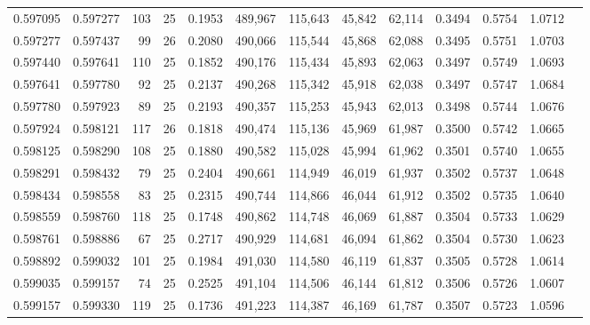 \begin{tabular}{rrrrrrrrrrrrr}
0.597095 & 0.597277 &   103 &  25 &                                     0.1953 & 489,967 & 115,643 &  45,842 &  62,114 & 0.3494 & 0.5754 & 1.0712 \\
0.597277 & 0.597437 &    99 &  26 &                                     0.2080 & 490,066 & 115,544 &  45,868 &  62,088 & 0.3495 & 0.5751 & 1.0703 \\
0.597440 & 0.597641 &   110 &  25 &                                     0.1852 & 490,176 & 115,434 &  45,893 &  62,063 & 0.3497 & 0.5749 & 1.0693 \\
0.597641 & 0.597780 &    92 &  25 &                                     0.2137 & 490,268 & 115,342 &  45,918 &  62,038 & 0.3497 & 0.5747 & 1.0684 \\
0.597780 & 0.597923 &    89 &  25 &                                     0.2193 & 490,357 & 115,253 &  45,943 &  62,013 & 0.3498 & 0.5744 & 1.0676 \\
0.597924 & 0.598121 &   117 &  26 &                                     0.1818 & 490,474 & 115,136 &  45,969 &  61,987 & 0.3500 & 0.5742 & 1.0665 \\
0.598125 & 0.598290 &   108 &  25 &                                     0.1880 & 490,582 & 115,028 &  45,994 &  61,962 & 0.3501 & 0.5740 & 1.0655 \\
0.598291 & 0.598432 &    79 &  25 &                                     0.2404 & 490,661 & 114,949 &  46,019 &  61,937 & 0.3502 & 0.5737 & 1.0648 \\
0.598434 & 0.598558 &    83 &  25 &                                     0.2315 & 490,744 & 114,866 &  46,044 &  61,912 & 0.3502 & 0.5735 & 1.0640 \\
0.598559 & 0.598760 &   118 &  25 &                                     0.1748 & 490,862 & 114,748 &  46,069 &  61,887 & 0.3504 & 0.5733 & 1.0629 \\
0.598761 & 0.598886 &    67 &  25 &                                     0.2717 & 490,929 & 114,681 &  46,094 &  61,862 & 0.3504 & 0.5730 & 1.0623 \\
0.598892 & 0.599032 &   101 &  25 &                                     0.1984 & 491,030 & 114,580 &  46,119 &  61,837 & 0.3505 & 0.5728 & 1.0614 \\
0.599035 & 0.599157 &    74 &  25 &                                     0.2525 & 491,104 & 114,506 &  46,144 &  61,812 & 0.3506 & 0.5726 & 1.0607 \\
0.599157 & 0.599330 &   119 &  25 &                                     0.1736 & 491,223 & 114,387 &  46,169 &  61,787 & 0.3507 & 0.5723 & 1.0596 \\

\end{tabular}
